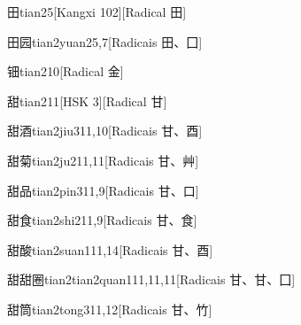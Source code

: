 \begin{entry}{田}{tian2}{5}[Kangxi 102][Radical ⽥]
\end{entry}

\begin{entry}{田园}{tian2yuan2}{5,7}[Radicais ⽥、⼞]
\end{entry}

\begin{entry}{钿}{tian2}{10}[Radical ⾦]
\end{entry}

\begin{entry}{甜}{tian2}{11}[HSK 3][Radical ⽢]
\end{entry}

\begin{entry}{甜酒}{tian2jiu3}{11,10}[Radicais ⽢、⾣]
\end{entry}

\begin{entry}{甜菊}{tian2ju2}{11,11}[Radicais ⽢、⾋]
\end{entry}

\begin{entry}{甜品}{tian2pin3}{11,9}[Radicais ⽢、⼝]
\end{entry}

\begin{entry}{甜食}{tian2shi2}{11,9}[Radicais ⽢、⾷]
\end{entry}

\begin{entry}{甜酸}{tian2suan1}{11,14}[Radicais ⽢、⾣]
\end{entry}

\begin{entry}{甜甜圈}{tian2tian2quan1}{11,11,11}[Radicais ⽢、⽢、⼞]
\end{entry}

\begin{entry}{甜筒}{tian2tong3}{11,12}[Radicais ⽢、⽵]
\end{entry}

